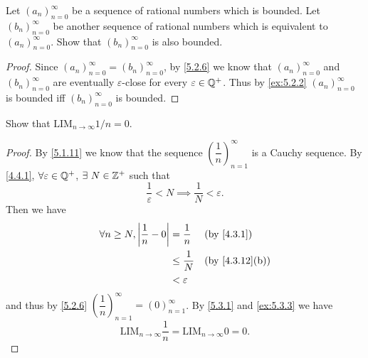 \begin{ex}\label{ex:5.3.4}
  Let \((a_n)_{n = 0}^{\infty}\) be a sequence of rational numbers which is bounded.
  Let \((b_n)_{n = 0}^{\infty}\) be another sequence of rational numbers which is equivalent to \((a_n)_{n = 0}^{\infty}\).
  Show that \((b_n)_{n = 0}^{\infty}\) is also bounded.
\end{ex}

\begin{proof}
  Since \((a_n)_{n = 0}^{\infty} = (b_n)_{n = 0}^{\infty}\), by \cref{5.2.6} we know that \((a_n)_{n = 0}^{\infty}\) and \((b_n)_{n = 0}^{\infty}\) are eventually \(\varepsilon\)-close for every \(\varepsilon \in \mathbb{Q}^+\).
  Thus by \cref{ex:5.2.2} \((a_n)_{n = 0}^{\infty}\) is bounded iff \((b_n)_{n = 0}^{\infty}\) is bounded.
\end{proof}

\begin{ex}\label{ex:5.3.5}
  Show that \(\text{LIM}_{n \to \infty} 1 / n = 0\).
\end{ex}

\begin{proof}
  By \cref{5.1.11} we know that the sequence \((\dfrac{1}{n})_{n = 1}^{\infty}\) is a Cauchy sequence.
  By \cref{4.4.1}, \(\forall \varepsilon \in \mathbb{Q}^+\), \(\exists\ N \in \mathbb{Z}^+\) such that
  \[
    \dfrac{1}{\varepsilon} < N \implies \dfrac{1}{N} < \varepsilon.
  \]
  Then we have
  \begin{align*}
    \forall n \geq N, \abs{\dfrac{1}{n} - 0} & = \dfrac{1}{n}    &  & \text{(by \cref{4.3.1})}     \\
                                             & \leq \dfrac{1}{N} &  & \text{(by \cref{4.3.12}(b))} \\
                                             & < \varepsilon
  \end{align*}
  and thus by \cref{5.2.6} \((\dfrac{1}{n})_{n = 1}^\infty = (0)_{n = 1}^\infty\).
  By \cref{5.3.1} and \cref{ex:5.3.3} we have
  \[
    \text{LIM}_{n \to \infty} \dfrac{1}{n} = \text{LIM}_{n \to \infty} 0 = 0.
  \]
\end{proof}
